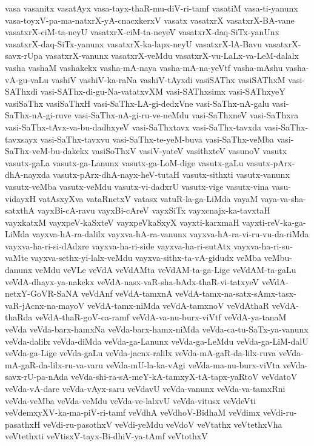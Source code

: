 {vasa
vasanitx
vasatAyx
vasa-tayx-thaR-mu-diV-ri-tamf
vasatiM
vasa-ti-yanunx
vasa-toyxV-pa-ma-natxrX-yA-cnacxkerxV
vasatx
vasatxrX
vasatxrX-BA-vane
vasatxrX-ciM-ta-neyU
vasatxrX-ciM-ta-neyeV
vasatxrX-daq-SiTx-yanUnx
vasatxrX-daq-SiTx-yanunx
vasatxrX-ka-lapx-neyU
vasatxrX-lA-Bavu
vasatxrX-savx-rUpa
vasatxrX-vanunx
vasatxrX-veMdu
vasatxrX-vu-LaLx-va-LeM-dalalx
vasha
vashaM
vashakekx
vasha-mA-naya
vasha-mA-na-yeVtf
vasha-mAshu
vasha-vA-gu-vaLu
vashiV
vashiV-ka-raNa
vashiV-tAyxdi
vasiSAThx
vasiSAThxM
vasi-SAThxdi
vasi-SAThx-di-gu-Na-vatatxvXM
vasi-SAThxsimx
vasi-SAThxyeY
vasiSaThx
vasiSaThxH
vasi-SaThx-LA-gi-dedxVne
vasi-SaThx-nA-galu
vasi-SaThx-nA-gi-ruve
vasi-SaThx-nA-gi-ru-ve-neMdu
vasi-SaThxneV
vasi-SaThxra
vasi-SaThx-tAvx-va-bu-dadhxyeV
vasi-SaThxtavx
vasi-SaThx-tavxda
vasi-SaThx-tavxsayx
vasi-SaThx-tavxvu
vasi-SaThx-te-yeM-buva
vasi-SaThx-veMba
vasi-SaThx-veM-bu-dakekx
vasiSoThxV
vasiV-yateV
vasithxteV
vasunoV
vasutx
vasutx-gaLa
vasutx-ga-Lanunx
vasutx-ga-LoM-dige
vasutx-gaLu
vasutx-pArx-dhA-nayxda
vasutx-pArx-dhA-nayx-heV-tutaH
vasutx-sithxti
vasutx-vanunx
vasutx-veMba
vasutx-veMdu
vasutx-vi-dadxrU
vasutx-vige
vasutx-vina
vasu-vidayxH
vatAsxyXva
vataRnetxV
vatasx
vatuR-la-ga-LiMda
vayaM
vaya-va-sha-satxthA
vayxBi-cA-ravu
vayxBi-cAreV
vayxSiTx
vayxcnajx-ka-tavxtaH
vayxkatxM
vayxpeV-kaSxteV
vayxpeVkaSxyX
vayxti-karxmaH
vayxti-reV-ka-ga-LiMda
vayxva-hA-ra-dalilx
vayxva-hA-ra-vanunx
vayxva-hA-ra-vi-ru-vu-da-riMda
vayxva-ha-ri-si-dAdxre
vayxva-ha-ri-side
vayxva-ha-ri-sutAtx
vayxva-ha-ri-su-vaMte
vayxva-sethx-yi-lalx-veMdu
vayxva-sithx-ta-vA-gidudx
veMba
veMbu-danunx
veMdu
veVLe
veVdA
veVdAMta
veVdAM-ta-ga-Lige
veVdAM-ta-gaLu
veVdA-dhayx-ya-nakekx
veVdA-nasx-vaR-sha-bAdx-thaR-vi-tatxyeV
veVdA-netxY-GoVR-SaNA
veVdAnf
veVdA-tamxnA
veVdA-tamx-na-satx-sAmx-tasx-vaR-jAcnx-na-mayoV
veVdA-tamx-niMda
veVdA-tamxnoV
veVdAthaR
veVdA-thaRda
veVdA-thaR-goV-ca-ramf
veVdA-va-nu-burx-viVtf
veVdA-ya-tanaM
veVda
veVda-barx-hamxNa
veVda-barx-hamx-niMda
veVda-ca-tu-SaTx-ya-vanunx
veVda-dalilx
veVda-diMda
veVda-ga-Lanunx
veVda-ga-LeMdu
veVda-ga-LiM-dalU
veVda-ga-Lige
veVda-gaLu
veVda-jacnx-ralilx
veVda-mA-gaR-da-lilx-ruva
veVda-mA-gaR-da-lilx-ru-va-varu
veVda-mU-la-ka-vAgi
veVda-ma-nu-burx-viVta
veVda-savx-rU-pa-nAda
veVda-shi-ra-sA-meY-kA-tamxyX-tA-tapx-yaRtoV
veVdatoV
veVda-vA-dare
veVda-vAyx-saru
veVdavU
veVda-vanunx
veVda-va-tamxRni
veVda-veMba
veVda-veMdu
veVda-ve-lalxvU
veVda-vitusx
veVdeVti
veVdemxyXV-ka-ma-piV-ri-tamf
veVdhA
veVdhoV-BidhaM
veVdimx
veVdi-ru-pasathxH
veVdi-ru-pasothxV
veVdi-yeMdu
veVdoV
veVtathx
veVtethxVha
veVtethxti
veVtisxV-tayx-Bi-dhiV-ya-tAmf
veVtothxV
}
